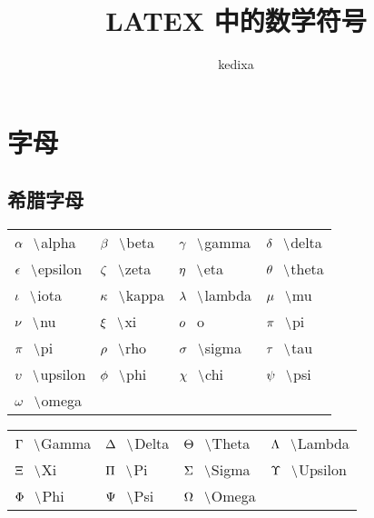 \documentclass{ctexart}
\newcommand{\sihao}{\fontsize{14pt}{\baselineskip}\selectfont}
\newcommand{\pair}[2]{${#1} \hspace{0.3cm} \backslash ${#2}}
\newcommand{\nbpair}[2]{${#1} \hspace{0.3cm} ${#2}} %
\begin{document}
\title{LATEX 中的数学符号}
\author{kedixa}
\maketitle
\section{字母}
\subsection{希腊字母}
\sihao
\begin{tabular}{p{3cm}p{3cm}p{3cm}p{3cm}}
    \pair{\alpha}{alpha} & \pair{\beta}{beta} & \pair{\gamma}{gamma} & \pair{\delta}{delta} \\
    \pair{\epsilon}{epsilon} & \pair{\zeta}{zeta} & \pair{\eta}{eta} & \pair{\theta}{theta} \\
    \pair{\iota}{iota} & \pair{\kappa}{kappa} & \pair{\lambda}{lambda} & \pair{\mu}{mu} \\
    \pair{\nu}{nu} & \pair{\xi}{xi} & \nbpair{o}{o} & \pair{\pi}{pi} \\
    \pair{\pi}{pi} & \pair{\rho}{rho} & \pair{\sigma}{sigma} & \pair{\tau}{tau} \\
    \pair{\upsilon}{upsilon} & \pair{\phi}{phi} & \pair{\chi}{chi} & \pair{\psi}{psi} \\
    \pair{\omega}{omega} & & &\\
\end{tabular}

\vspace{0.5cm}
\begin{tabular}{p{3cm}p{3cm}p{3cm}p{3cm}}
    \pair{\Gamma}{Gamma} & \pair{\Delta}{Delta} & \pair{\Theta}{Theta} & \pair{\Lambda}{Lambda} \\
    \pair{\Xi}{Xi} & \pair{\Pi}{Pi} & \pair{\Sigma}{Sigma} & \pair{\Upsilon}{Upsilon} \\
    \pair{\Phi}{Phi} & \pair{\Psi}{Psi} & \pair{\Omega}{Omega} &\\
\end{tabular}
\end{document}
